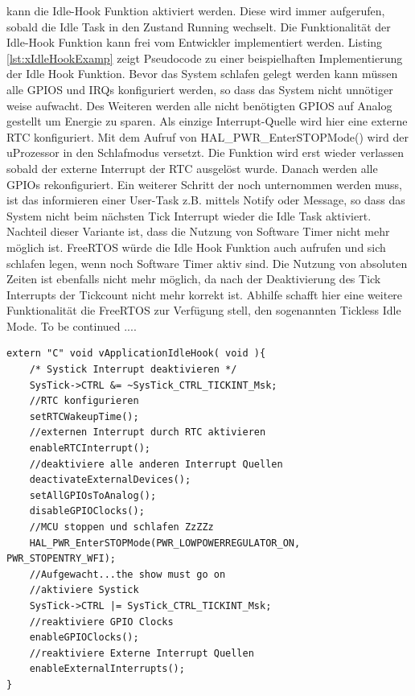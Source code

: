 \documentclass[ngerman]{seminarvorlage}
\begin{document}
kann die Idle-Hook Funktion aktiviert werden. Diese wird immer aufgerufen, sobald die Idle Task in den Zustand Running wechselt. Die Funktionalität der Idle-Hook Funktion kann frei vom Entwickler implementiert werden. Listing \ref{lst:xIdleHookExamp} zeigt Pseudocode zu einer beispielhaften Implementierung der Idle Hook Funktion. Bevor das System schlafen gelegt werden kann müssen alle GPIOS und IRQs konfiguriert werden, so dass das System nicht unnötiger weise aufwacht. Des Weiteren werden alle nicht benötigten GPIOS auf Analog gestellt um Energie zu sparen. Als einzige Interrupt-Quelle wird hier eine externe RTC konfiguriert. Mit dem Aufruf von HAL\_PWR\_EnterSTOPMode() wird der uProzessor in den Schlafmodus versetzt. Die Funktion wird erst wieder verlassen sobald der externe Interrupt der RTC ausgelöst wurde. Danach werden alle GPIOs rekonfiguriert. Ein weiterer Schritt der noch unternommen werden muss, ist das informieren einer User-Task z.B. mittels Notify oder Message, so dass das System nicht beim nächsten Tick Interrupt wieder die Idle Task aktiviert. Nachteil dieser Variante ist, dass die Nutzung von Software Timer nicht mehr möglich ist. FreeRTOS würde die Idle Hook Funktion auch aufrufen und sich schlafen legen, wenn noch Software Timer aktiv sind. Die Nutzung von absoluten Zeiten ist ebenfalls nicht mehr möglich, da nach der Deaktivierung des Tick Interrupts der Tickcount nicht mehr korrekt ist. Abhilfe schafft hier eine weitere Funktionalität die FreeRTOS zur Verfügung stell, den sogenannten Tickless Idle Mode. To be continued ....

       

\begin{lstlisting}[caption={Beispiel Implementierung der Idle Hook Funktion},captionpos=b, label=lst:xIdleHookExamp, float=hbt!]
extern "C" void vApplicationIdleHook( void ){
	/* Systick Interrupt deaktivieren */
	SysTick->CTRL &= ~SysTick_CTRL_TICKINT_Msk;
	//RTC konfigurieren
	setRTCWakeupTime();
	//externen Interrupt durch RTC aktivieren
	enableRTCInterrupt();
	//deaktiviere alle anderen Interrupt Quellen
	deactivateExternalDevices();
	setAllGPIOsToAnalog(); 
	disableGPIOClocks();
	//MCU stoppen und schlafen ZzZZz
	HAL_PWR_EnterSTOPMode(PWR_LOWPOWERREGULATOR_ON, PWR_STOPENTRY_WFI); 
	//Aufgewacht...the show must go on
	//aktiviere Systick
	SysTick->CTRL |= SysTick_CTRL_TICKINT_Msk;
	//reaktiviere GPIO Clocks
	enableGPIOClocks();
	//reaktiviere Externe Interrupt Quellen
	enableExternalInterrupts();	
}
\end{lstlisting}
\end{document}
